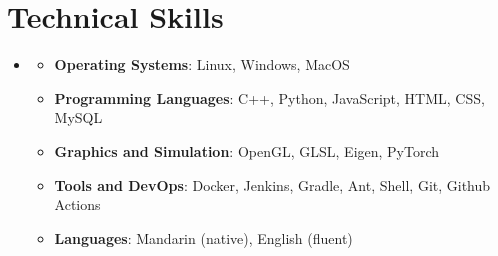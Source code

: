 \documentclass[letterpaper,11pt]{article}
\newcommand{\resumeItem}[1]{
  \item\small{
    {#1 \vspace{-2pt}}
  }
}
\newcommand{\resumeSubHeadingListStart}{\begin{itemize}[leftmargin=0in, label={}]}
\newcommand{\resumeSubHeadingListEnd}{\end{itemize}}
\newcommand{\resumeItemListStart}{\begin{itemize}}
\newcommand{\resumeItemListEnd}{\end{itemize}\vspace{-5pt}}
\begin{document}
\section{Technical Skills}
\resumeSubHeadingListStart
  \item
  \resumeItemListStart
    \resumeItem{\textbf{Operating Systems}{: Linux, Windows, MacOS}}
    \resumeItem{\textbf{Programming Languages}{: C++, Python, JavaScript, HTML, CSS, MySQL}}
    \resumeItem{ \textbf{Graphics and Simulation}{: OpenGL, GLSL, Eigen, PyTorch}}
    \resumeItem{\textbf{Tools and DevOps}{: Docker, Jenkins, Gradle, Ant, Shell, Git, Github Actions}}
    \resumeItem{\textbf{Languages}{: Mandarin (native), English (fluent)}}
  \resumeItemListEnd
\resumeSubHeadingListEnd


\end{document}
